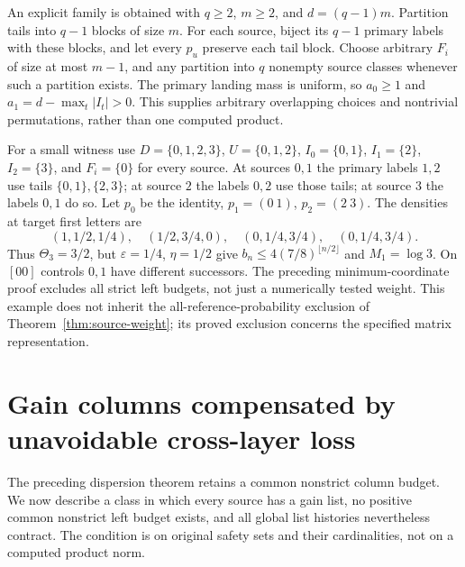 \documentclass[11pt,reqno]{amsart}
\numberwithin{equation}{section}
\theoremstyle{definition}
\newcommand{\eps}{\varepsilon}
\begin{document}
An explicit family is obtained with $q\ge2$, $m\ge2$, and
$d=(q-1)m$. Partition tails into $q-1$ blocks of size $m$.
For each source, biject its $q-1$ primary labels with these blocks,
and let every $p_u$ preserve each tail block. Choose arbitrary
$F_i$ of size at most $m-1$, and any partition into $q$ nonempty
source classes whenever such a partition exists. The primary
landing mass is uniform, so $a_0\ge1$ and
$a_1=d-\max_t|I_t|>0$. This supplies arbitrary overlapping
choices and nontrivial permutations, rather than one computed product.

For a small witness use $D=\{0,1,2,3\}$, $U=\{0,1,2\}$,
$I_0=\{0,1\}$, $I_1=\{2\}$, $I_2=\{3\}$, and
$F_i=\{0\}$ for every source. At sources $0,1$ the primary
labels $1,2$ use tails $\{0,1\},\{2,3\}$; at source $2$ the
labels $0,2$ use those tails; at source $3$ the labels $0,1$ do so.
Let $p_0$ be the identity, $p_1=(0\ 1)$, $p_2=(2\ 3)$.
The densities at target first letters are
\[
 (1,1/2,1/4),\quad(1/2,3/4,0),\quad
 (0,1/4,3/4),\quad(0,1/4,3/4).
\]
Thus $\Theta_3=3/2$, but $\eps=1/4$, $\eta=1/2$ give
$b_n\le4(7/8)^{\lfloor n/2\rfloor}$ and $M_1=\log3$.
On $[00]$ controls $0,1$ have different successors. The preceding
minimum-coordinate proof excludes all strict left budgets, not
just a numerically tested weight. This example does not inherit
the all-reference-probability exclusion of
Theorem~\ref{thm:source-weight}; its proved exclusion concerns
the specified matrix representation.

\section{Gain columns compensated by unavoidable cross-layer loss}
\label{sec:gainloss}

The preceding dispersion theorem retains a common nonstrict column
budget. We now describe a class in which every source has a gain
list, no positive common nonstrict left budget exists, and all global
list histories nevertheless contract. The condition is on original
safety sets and their cardinalities, not on a computed product norm.
\end{document}

